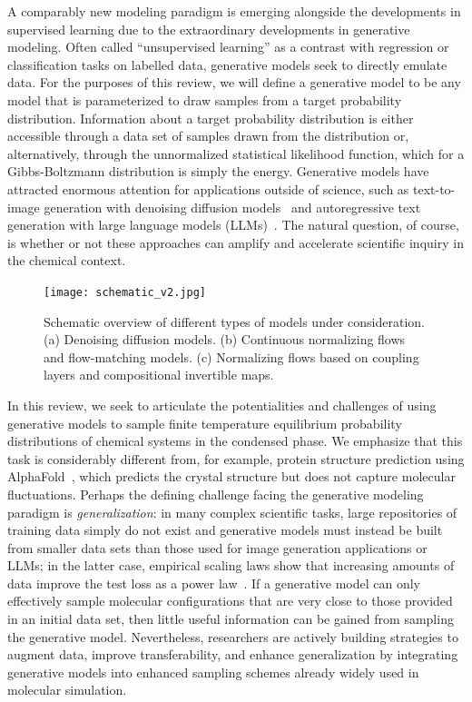 \documentclass[11pt]{article}
\begin{document}
A comparably new modeling paradigm is emerging alongside the developments in supervised learning due to the extraordinary developments in generative modeling.
Often called ``unsupervised learning'' as a contrast with regression or classification tasks on labelled data, generative models seek to directly emulate data.
For the purposes of this review, we will define a generative model to be any model that is parameterized to draw samples from a target probability distribution.
Information about a target probability distribution is either accessible through a data set of samples drawn from the distribution or, alternatively, through the unnormalized statistical likelihood function, which for a Gibbs-Boltzmann distribution is simply the energy.  
Generative models have attracted enormous attention for applications outside of science, such as text-to-image generation with denoising diffusion models~\cite{song_score-based_2022,ho_denoising_nodate} and autoregressive text generation with large language models (LLMs)~\cite{vaswani_attention_2017}. 
The natural question, of course, is whether or not these approaches can amplify and accelerate scientific inquiry in the chemical context.

\begin{figure}
\begin{center}
\texttt{[image: schematic\_v2.jpg]}
\end{center}
\caption{Schematic overview of different types of models under consideration. (a) Denoising diffusion models. (b) Continuous normalizing flows and flow-matching models. (c) Normalizing flows based on coupling layers and compositional invertible maps.}
\label{fig:models}
\end{figure}

In this review, we seek to articulate the potentialities and challenges of using generative models to sample finite temperature equilibrium probability distributions of chemical systems in the condensed phase.
We emphasize that this task is considerably different from, for example, protein structure prediction using AlphaFold~\cite{jumper_highly_2021, watson_novo_2023}, which predicts the crystal structure but does not capture molecular fluctuations.
Perhaps the defining challenge facing the generative modeling paradigm is \emph{generalization}: in many complex scientific tasks, large repositories of training data simply do not exist and generative models must instead be built from smaller data sets than those used for image generation applications or LLMs; in the latter case, empirical scaling laws show that increasing amounts of data improve the test loss as a power law~\cite{kaplan_scaling_2020, dyer_explaining_2021}.
If a generative model can only effectively sample molecular configurations that are very close to those provided in an initial data set, then little useful information can be gained from sampling the generative model. 
Nevertheless, researchers are actively building strategies to augment data, improve transferability, and enhance generalization by integrating generative models into enhanced sampling schemes already widely used in molecular simulation.
\end{document}
